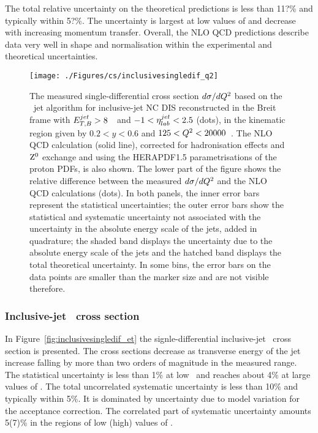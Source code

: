 The total relative uncertainty on the theoretical predictions is less than 11?\% and typically within 5?\%. The uncertainty is largest at low values of \qsq and decrease with increasing momentum transfer. Overall, the NLO QCD predictions describe data very well in shape and normalisation within the experimental and theoretical uncertainties.
\begin{figure}[p]
	\centering
		\texttt{[image: ./Figures/cs/inclusivesingledif\_q2]}
	\caption{The measured single-differential cross section $d\sigma/d\mbox{${Q^2}$}$ based on the \kt~jet algorithm for inclusive-jet NC DIS reconstructed in the Breit frame with $\mbox{$E_{T,B}^{jet}$} > 8$~\GeV~and $-1<\mbox{$\eta^{jet}_{lab}$}<2.5$ (dots), in the kinematic region given by $0.2<y<0.6$ and $125 < \mbox{${Q^2}$} < 20000$~\GeV. The NLO QCD calculation (solid line), corrected for hadronisation effects and $\mbox{$\rm{Z}^0$}$ exchange and using the HERAPDF1.5 parametrisations of the proton PDFs, is also shown. The lower part of the figure shows the relative difference between the measured $d\sigma/d\mbox{${Q^2}$}$ and the NLO QCD calculations (dots). In both panels, the inner error bars represent the statistical uncertainties; the outer error bars show the statistical and systematic uncertainty not associated with the uncertainty in the absolute energy scale of the jets, added in quadrature; the shaded band displays the uncertainty due to the absolute energy scale of the jets and the hatched band displays the total theoretical uncertainty. In some bins, the error bars on the data points are smaller than the marker size and are not visible therefore.} 
	\label{fig:inclusivesingledif_q2}
\end{figure}

\subsubsection*{Inclusive-jet \dsdetjetb~cross section}
In Figure~\ref{fig:inclusivesingledif_et} the signle-differential inclusive-jet \dsdetjetb~cross section is presented. The cross sections decrease as transverse energy of the jet increase falling by more than two orders of magnitude in the measured range. The statistical uncertainty is less than 1\% at low \etjetb~and reaches about 4\% at large values of \etjetb. The total uncorrelated systematic uncertainty is less than 10\% and typically within 5\%. It is dominated by uncertainty due to model variation for the acceptance correction. The correlated part of systematic uncertainty amounts 5(7)\%  in the regions of low (high) values of \etjetb.

